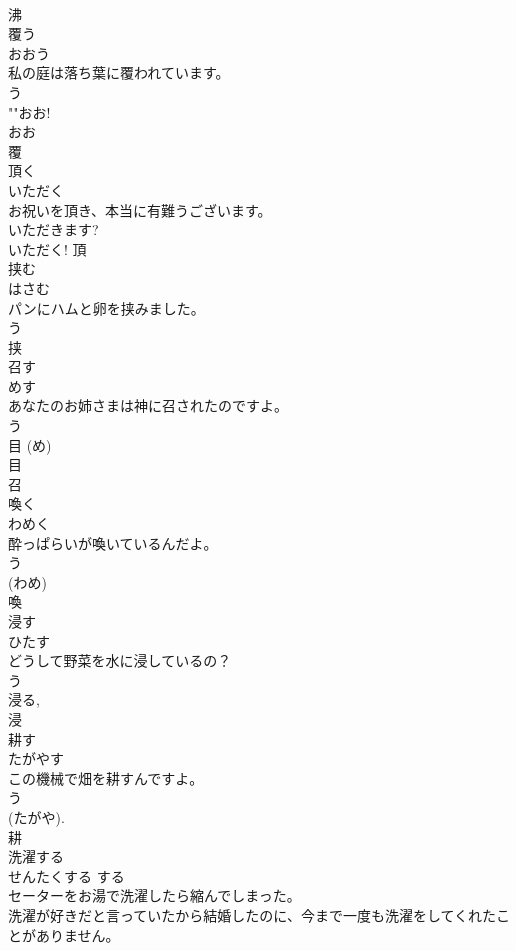 \documentclass[8pt]{extreport}
\begin{document}
\begin{CJK}{UTF8}{min}
\\	沸	
\\	覆う	
\\	おおう	
\\	私の庭は落ち葉に覆われています。	
\\	う 
\\	""おお!
\\	おお 
\\	覆	
\\	頂く	
\\	いただく	
\\	お祝いを頂き、本当に有難うございます。	
\\	いただきます? 
\\	いただく!	頂	
\\	挟む	
\\	はさむ	
\\	パンにハムと卵を挟みました。	
\\	う 
\\	挟	
\\	召す	
\\	めす	
\\	あなたのお姉さまは神に召されたのですよ。	
\\	う 
\\	目 (め) 
\\	目 
\\	召	
\\	喚く	
\\	わめく	
\\	酔っぱらいが喚いているんだよ。	
\\	う 
\\	(わめ) 
\\	喚	
\\	浸す	
\\	ひたす	
\\	どうして野菜を水に浸しているの？	
\\	う 
\\	浸る, 
\\	浸	
\\	耕す	
\\	たがやす	
\\	この機械で畑を耕すんですよ。	
\\	う 
\\	(たがや). 
\\	耕	
\\	洗濯する	
\\	せんたくする	する 
\\	セーターをお湯で洗濯したら縮んでしまった。	
\\	洗濯が好きだと言っていたから結婚したのに、今まで一度も洗濯をしてくれたことがありません。	

\end{CJK}
\end{document}
